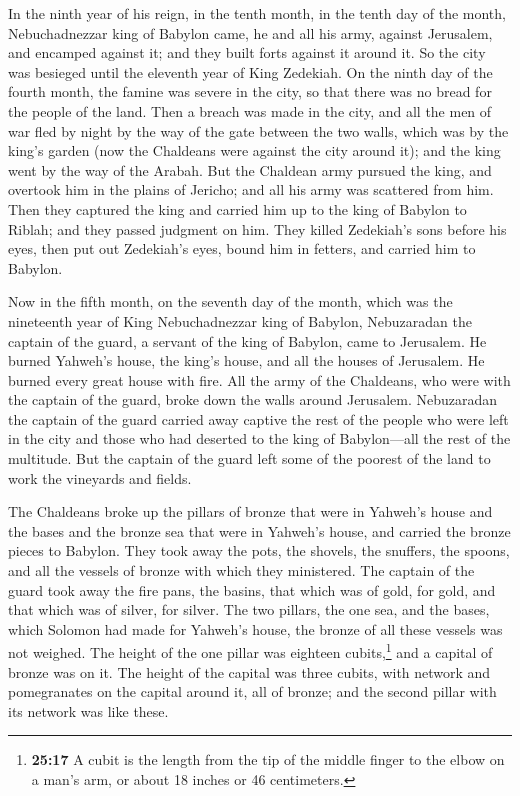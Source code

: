  In the ninth year of his reign, in the tenth month, in
the tenth day of the month, Nebuchadnezzar king of Babylon came, he and
all his army, against Jerusalem, and encamped against it; and they built
forts against it around it.  So the city was besieged
until the eleventh year of King Zedekiah.  On the ninth
day of the fourth month, the famine was severe in the city, so that
there was no bread for the people of the land.  Then a
breach was made in the city, and all the men of war fled by night by the
way of the gate between the two walls, which was by the king's garden
(now the Chaldeans were against the city around it); and the king went
by the way of the Arabah.  But the Chaldean army pursued
the king, and overtook him in the plains of Jericho; and all his army
was scattered from him.  Then they captured the king and
carried him up to the king of Babylon to Riblah; and they passed
judgment on him.  They killed Zedekiah's sons before his
eyes, then put out Zedekiah's eyes, bound him in fetters, and carried
him to Babylon.

 Now in the fifth month, on the seventh day of the month,
which was the nineteenth year of King Nebuchadnezzar king of Babylon,
Nebuzaradan the captain of the guard, a servant of the king of Babylon,
came to Jerusalem.  He burned Yahweh's house, the king's
house, and all the houses of Jerusalem. He burned every great house with
fire.  All the army of the Chaldeans, who were with the
captain of the guard, broke down the walls around Jerusalem.
 Nebuzaradan the captain of the guard carried away
captive the rest of the people who were left in the city and those who
had deserted to the king of Babylon---all the rest of the multitude.
 But the captain of the guard left some of the poorest of
the land to work the vineyards and fields.

 The Chaldeans broke up the pillars of bronze that were
in Yahweh's house and the bases and the bronze sea that were in Yahweh's
house, and carried the bronze pieces to Babylon.  They
took away the pots, the shovels, the snuffers, the spoons, and all the
vessels of bronze with which they ministered.  The
captain of the guard took away the fire pans, the basins, that which was
of gold, for gold, and that which was of silver, for silver.
 The two pillars, the one sea, and the bases, which
Solomon had made for Yahweh's house, the bronze of all these vessels was
not weighed.  The height of the one pillar was eighteen
cubits,\footnote{\textbf{25:17} A cubit is the length from the tip of
  the middle finger to the elbow on a man's arm, or about 18 inches or
  46 centimeters.} and a capital of bronze was on it. The height of the
capital was three cubits, with network and pomegranates on the capital
around it, all of bronze; and the second pillar with its network was
like these.

